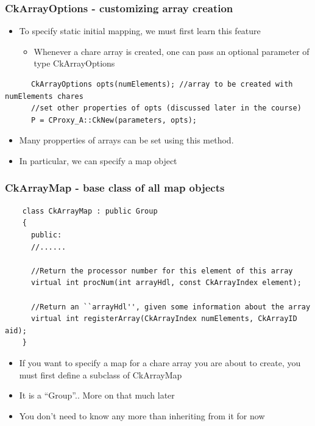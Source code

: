 \documentclass{beamer}
\begin{document}
\begin{frame}[fragile]
    \frametitle{CkArrayOptions - customizing array creation}
    \begin{itemize}
      \item To specify static initial mapping, we must first learn this feature
      \begin{itemize}
        \item Whenever a chare array is created, one can pass an optional
        parameter of type CkArrayOptions
      \end{itemize}
    \end{itemize}
      \begin{lstlisting}
      CkArrayOptions opts(numElements); //array to be created with numElements chares
      //set other properties of opts (discussed later in the course)
      P = CProxy_A::CkNew(parameters, opts);
      \end{lstlisting}
    \begin{itemize}
      \item Many propperties of arrays can be set using this method.
      \item {\color{red} In particular, we can specify a map object}
    \end{itemize}
\end{frame}

\begin{frame}[fragile]
    \frametitle{CkArrayMap - base class of all map objects}
    \begin{lstlisting}
    class CkArrayMap : public Group
    {
      public:
      //......
      
      //Return the processor number for this element of this array
      virtual int procNum(int arrayHdl, const CkArrayIndex element);

      //Return an ``arrayHdl'', given some information about the array
      virtual int registerArray(CkArrayIndex numElements, CkArrayID aid);
    }
    \end{lstlisting}
    \begin{itemize}
    \item If you want to specify a map for a chare array you are about to
    create, you must first define a subclass of CkArrayMap
    \item It is a “Group”.. More on that much later
    \item You don’t need to know any more than inheriting from it for now
    \end{itemize}
\end{frame}
\end{document}
